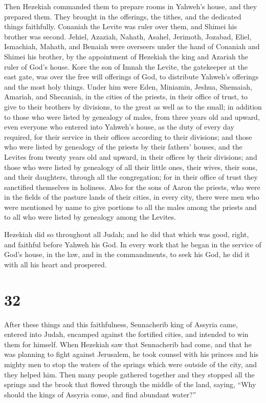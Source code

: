  Then Hezekiah commanded them to prepare rooms in Yahweh's
house, and they prepared them.  They brought in the
offerings, the tithes, and the dedicated things faithfully. Conaniah the
Levite was ruler over them, and Shimei his brother was second.
 Jehiel, Azaziah, Nahath, Asahel, Jerimoth, Jozabad, Eliel,
Ismachiah, Mahath, and Benaiah were overseers under the hand of Conaniah
and Shimei his brother, by the appointment of Hezekiah the king and
Azariah the ruler of God's house.  Kore the son of Imnah
the Levite, the gatekeeper at the east gate, was over the free will
offerings of God, to distribute Yahweh's offerings and the most holy
things.  Under him were Eden, Miniamin, Jeshua, Shemaiah,
Amariah, and Shecaniah, in the cities of the priests, in their office of
trust, to give to their brothers by divisions, to the great as well as
to the small;  in addition to those who were listed by
genealogy of males, from three years old and upward, even everyone who
entered into Yahweh's house, as the duty of every day required, for
their service in their offices according to their divisions;
 and those who were listed by genealogy of the priests by
their fathers' houses, and the Levites from twenty years old and upward,
in their offices by their divisions;  and those who were
listed by genealogy of all their little ones, their wives, their sons,
and their daughters, through all the congregation; for in their office
of trust they sanctified themselves in holiness.  Also for
the sons of Aaron the priests, who were in the fields of the pasture
lands of their cities, in every city, there were men who were mentioned
by name to give portions to all the males among the priests and to all
who were listed by genealogy among the Levites.

 Hezekiah did so throughout all Judah; and he did that
which was good, right, and faithful before Yahweh his God. 
In every work that he began in the service of God's house, in the law,
and in the commandments, to seek his God, he did it with all his heart
and prospered.

\hypertarget{section-31}{%
\section{32}\label{section-31}}

 After these things and this faithfulness, Sennacherib king
of Assyria came, entered into Judah, encamped against the fortified
cities, and intended to win them for himself.  When Hezekiah
saw that Sennacherib had come, and that he was planning to fight against
Jerusalem,  he took counsel with his princes and his mighty
men to stop the waters of the springs which were outside of the city,
and they helped him.  Then many people gathered together and
they stopped all the springs and the brook that flowed through the
middle of the land, saying, ``Why should the kings of Assyria come, and
find abundant water?''

